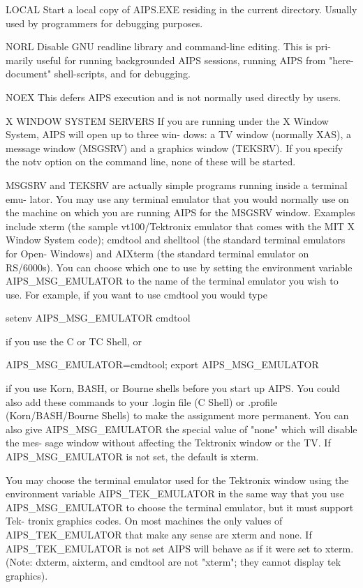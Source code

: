        LOCAL   Start a local copy of AIPS.EXE  residing  in  the  current  directory.
               Usually used by programmers for debugging purposes.

       NORL    Disable  GNU  readline library and command-line editing.  This is pri-
               marily useful for running backgrounded  AIPS  sessions,  running  AIPS
               from "here-document" shell-scripts, and for debugging.

       NOEX    This defers AIPS execution and is not normally used directly by users.


X WINDOW SYSTEM SERVERS
       If  you are running under the X Window System, AIPS will open up to three win-
       dows: a TV window (normally XAS), a message window  (MSGSRV)  and  a  graphics
       window  (TEKSRV).  If you specify the notv option on the command line, none of
       these will be started.

       MSGSRV and TEKSRV are actually simple programs running inside a terminal  emu-
       lator.   You  may use any terminal emulator that you would normally use on the
       machine on which you are running AIPS for the MSGSRV window.  Examples include
       xterm  (the  sample  vt100/Tektronix emulator that comes with the MIT X Window
       System code); cmdtool and shelltool (the standard terminal emulators for Open-
       Windows)  and  AIXterm  (the standard terminal emulator on RS/6000s).  You can
       choose which one to use by setting the environment variable  AIPS_MSG_EMULATOR
       to  the  name  of  the terminal emulator you wish to use.  For example, if you
       want to use cmdtool you would type

       setenv AIPS_MSG_EMULATOR cmdtool

       if you use the C or TC Shell, or

       AIPS_MSG_EMULATOR=cmdtool; export AIPS_MSG_EMULATOR

       if you use Korn, BASH, or Bourne shells before you start up AIPS.   You  could
       also   add   these  commands  to  your  .login  file  (C  Shell)  or  .profile
       (Korn/BASH/Bourne Shells) to make the assignment more permanent.  You can also
       give AIPS_MSG_EMULATOR the special value of "none" which will disable the mes-
       sage  window  without  affecting  the  Tektronix  window  or   the   TV.    If
       AIPS_MSG_EMULATOR is not set, the default is xterm.

       You  may  choose the terminal emulator used for the Tektronix window using the
       environment  variable  AIPS_TEK_EMULATOR  in  the  same  way  that   you   use
       AIPS_MSG_EMULATOR  to  choose  the terminal emulator, but it must support Tek-
       tronix graphics codes.  On most machines the only values of  AIPS_TEK_EMULATOR
       that  make any sense are xterm and none.  If AIPS_TEK_EMULATOR is not set AIPS
       will behave as if it were set to xterm.  (Note: dxterm, aixterm,  and  cmdtool
       are not "xterm"; they cannot display tek graphics).

